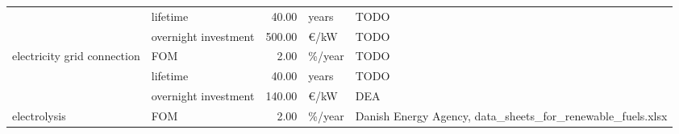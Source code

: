 \begin{longtable}{p{4cm}p{4cm}rp{3cm}p{10cm}}
                      & lifetime &        40.00 &                         years &                                                                                                                                                                                                                                                                                                                                 TODO \\
                      & overnight investment &       500.00 &                      \euro/kW &                                                                                                                                                                                                                                                                                                                                 TODO \\
electricity grid connection & FOM &         2.00 &                       \%/year &                                                                                                                                                                                                                                                                                                                                 TODO \\
                      & lifetime &        40.00 &                         years &                                                                                                                                                                                                                                                                                                                                 TODO \\
                      & overnight investment &       140.00 &                      \euro/kW &                                                                                                                                                                                                                                                                                                                                  DEA \\
electrolysis & FOM &         2.00 &                       \%/year &                                                                                                                                                                                                                                                                       Danish Energy Agency, data\_sheets\_for\_renewable\_fuels.xlsx \\

\end{longtable}
